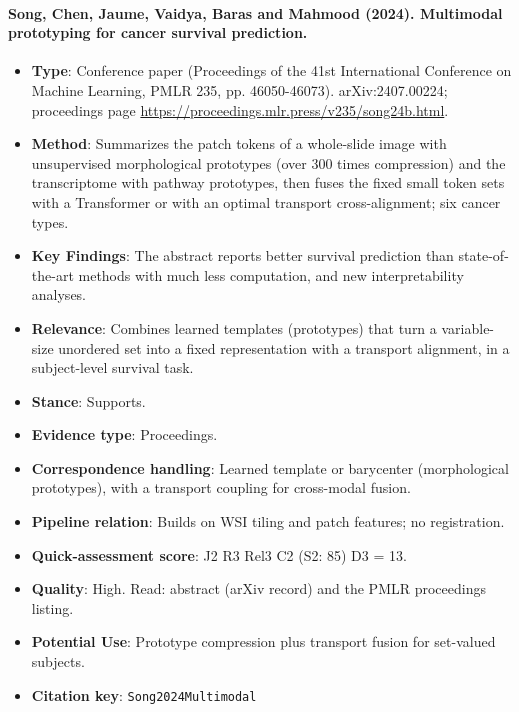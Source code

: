 \documentclass[journal,onecolumn]{IEEEtran}
\begin{document}
\paragraph{Song, Chen, Jaume, Vaidya, Baras and Mahmood (2024). Multimodal prototyping for cancer survival prediction.~\cite{Song2024Multimodal}}\mbox{}

\begin{itemize}

\item{} \textbf{Type}: Conference paper (Proceedings of the 41st International Conference on Machine Learning, PMLR 235, pp. 46050-46073). arXiv:2407.00224; proceedings page \url{https://proceedings.mlr.press/v235/song24b.html}.

\item{} \textbf{Method}: Summarizes the patch tokens of a whole-slide image with unsupervised morphological prototypes (over 300 times compression) and the transcriptome with pathway prototypes, then fuses the fixed small token sets with a Transformer or with an optimal transport cross-alignment; six cancer types.

\item{} \textbf{Key Findings}: The abstract reports better survival prediction than state-of-the-art methods with much less computation, and new interpretability analyses.

\item{} \textbf{Relevance}: Combines learned templates (prototypes) that turn a variable-size unordered set into a fixed representation with a transport alignment, in a subject-level survival task.

\item{} \textbf{Stance}: Supports.

\item{} \textbf{Evidence type}: Proceedings.

\item{} \textbf{Correspondence handling}: Learned template or barycenter (morphological prototypes), with a transport coupling for cross-modal fusion.

\item{} \textbf{Pipeline relation}: Builds on WSI tiling and patch features; no registration.

\item{} \textbf{Quick-assessment score}: J2 R3 Rel3 C2 (S2: 85) D3 = 13.

\item{} \textbf{Quality}: High. Read: abstract (arXiv record) and the PMLR proceedings listing.

\item{} \textbf{Potential Use}: Prototype compression plus transport fusion for set-valued subjects.

\item{} \textbf{Citation key}: \texttt{Song2024Multimodal}

\end{itemize}
\end{document}
